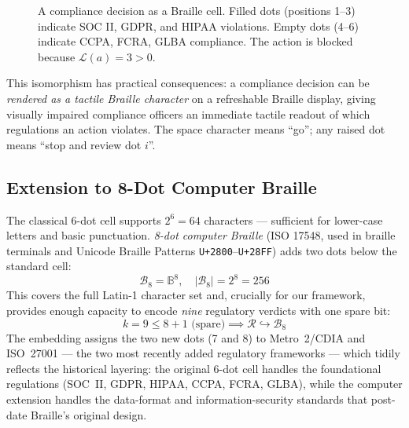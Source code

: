 \documentclass[11pt,twocolumn]{article}
\begin{document}
\begin{figure}[h]
\centering
{}
\caption{A compliance decision as a Braille cell. Filled dots (positions 1--3)
indicate SOC II, GDPR, and HIPAA violations. Empty dots (4--6) indicate CCPA,
FCRA, GLBA compliance. The action is blocked because $\mathcal{L}(a) = 3 > 0$.}
\label{fig:braille}
\end{figure}

This isomorphism has practical consequences: a compliance decision can be
\emph{rendered as a tactile Braille character} on a refreshable Braille display,
giving visually impaired compliance officers an immediate tactile readout of
which regulations an action violates. The space character means ``go'';
any raised dot means ``stop and review dot $i$''.

\subsection{Extension to 8-Dot Computer Braille}

The classical 6-dot cell supports $2^6 = 64$ characters — sufficient for
lower-case letters and basic punctuation. \emph{8-dot computer Braille}
(ISO 17548, used in braille terminals and Unicode Braille Patterns
\texttt{U+2800}--\texttt{U+28FF}) adds two dots below the standard cell:
\begin{equation}
  \mathcal{B}_8 = \mathbb{B}^8, \quad |\mathcal{B}_8| = 2^8 = 256
\end{equation}
This covers the full Latin-1 character set and, crucially for our framework,
provides enough capacity to encode \emph{nine} regulatory verdicts with
one spare bit:
\begin{equation}
  k = 9 \leq 8 + 1\text{ (spare)} \implies
  \mathcal{R} \hookrightarrow \mathcal{B}_8
\end{equation}
The embedding assigns the two new dots (7 and 8) to Metro~2/CDIA and
ISO~27001 — the two most recently added regulatory frameworks — which
tidily reflects the historical layering: the original 6-dot cell handles
the foundational regulations (SOC~II, GDPR, HIPAA, CCPA, FCRA, GLBA),
while the computer extension handles the data-format and information-security
standards that post-date Braille's original design.
\end{document}
